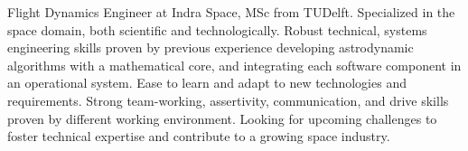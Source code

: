 \documentclass[letter,10pt]{article}
\begin{document}
\justifying

Flight Dynamics Engineer at Indra Space, MSc from TUDelft. Specialized in the space domain, both scientific and technologically. Robust technical, systems engineering skills proven by previous experience developing astrodynamic algorithms with a mathematical core, and integrating each software component in an operational system. Ease to learn and adapt to new technologies and requirements. Strong team-working, assertivity, communication, and drive skills proven by different working environment. Looking for upcoming challenges to foster technical expertise and contribute to a growing space industry.
\end{document}

